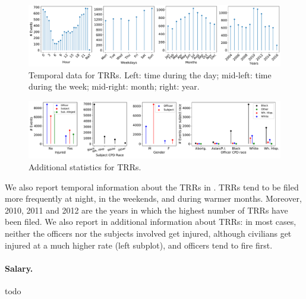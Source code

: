 \begin{figure}[h] 
	\includegraphics[width=\textwidth]{figs/trrs_times} 
	\caption{Temporal data for TRRs. Left: time during the day; mid-left: time during the week; mid-right: month; right: year.} \label{fig:trrs_times}
\end{figure}

\begin{figure}[h] 
	\includegraphics[width=\textwidth]{figs/trr_stats} 
	\caption{Additional statistics for TRRs.} \label{fig:trrs_stats1}
\end{figure}


We also report temporal information about the TRRs in . TRRs tend to be filed more frequently at night, in the weekends, and during warmer months. Moreover, 2010, 2011 and 2012 are the years in which the highest number of TRRs have been filed. We also report in  additional information about TRRs: in most cases, neither the officers nor the subjects involved get injured, although civilians get injured at a much higher rate (left subplot), and officers tend to fire first. 
\paragraph{Salary.} todo

